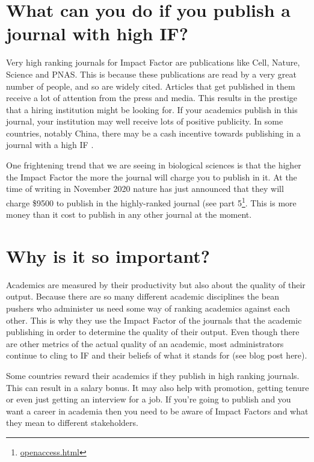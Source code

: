 \documentclass[
]{krantz}
\renewcommand{\href}[2]{#2\footnote{\url{#1}}}
\begin{document}
\hypertarget{what-can-you-do-if-you-publish-a-journal-with-high-if}{%
\section{What can you do if you publish a journal with high IF?}\label{what-can-you-do-if-you-publish-a-journal-with-high-if}}

Very high ranking journals for Impact Factor are publications like Cell, Nature, Science and PNAS. This is because these publications are read by a very great number of people, and so are widely cited. Articles that get published in them receive a lot of attention from the press and media. This results in the prestige that a hiring institution might be looking for. If your academics publish in this journal, your institution may well receive lots of positive publicity. In some countries, notably China, there may be a cash incentive towards publishing in a journal with a high IF \citep{quan2017publish}.

One frightening trend that we are seeing in biological sciences is that the higher the Impact Factor the more the journal will charge you to publish in it. At the time of writing in November 2020 nature has just announced that they will charge \$9500 to publish in the highly-ranked journal (see \href{openaccess.html}{part 5}. This is more money than it cost to publish in any other journal at the moment.

\hypertarget{why-is-it-so-important}{%
\section{Why is it so important?}\label{why-is-it-so-important}}

Academics are measured by their productivity but also about the quality of their output. Because there are so many different academic disciplines the bean pushers who administer us need some way of ranking academics against each other. This is why they use the Impact Factor of the journals that the academic publishing in order to determine the quality of their output. Even though there are other metrics of the actual quality of an academic, most administrators continue to cling to IF and their beliefs of what it stands for (see blog post here).

Some countries reward their academics if they publish in high ranking journals. This can result in a salary bonus. It may also help with promotion, getting tenure or even just getting an interview for a job. If you're going to publish and you want a career in academia then you need to be aware of Impact Factors and what they mean to different stakeholders.
\end{document}
